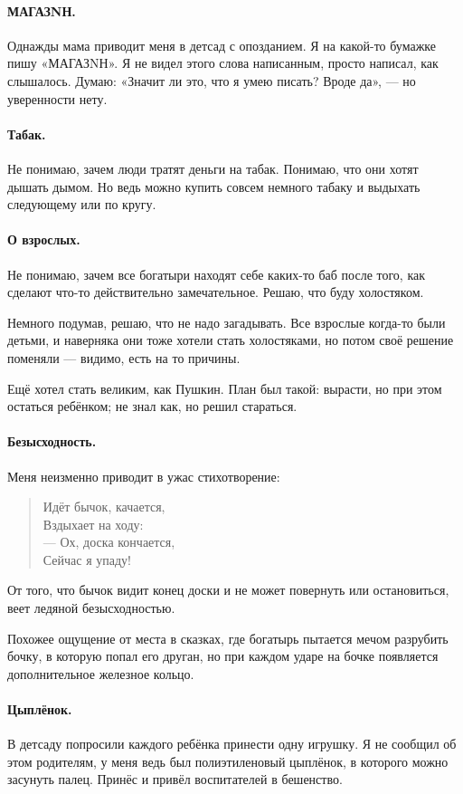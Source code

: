 \documentclass{book}
\begin{document}
\paragraph{МАГАЗNН.}
Однажды мама приводит меня в детсад с опозданием.
Я на какой-то бумажке пишу «МАГАЗNН».
Я не видел этого слова написанным, просто написал, как слышалось.
Думаю: «Значит ли это, что я умею писать?
Вроде да», --- но уверенности нету.

\paragraph{Табак.}
Не понимаю, зачем люди тратят деньги на табак.
Понимаю, что они хотят дышать дымом.
Но ведь можно купить совсем немного табаку и выдыхать следующему или по кругу.

\paragraph{О взрослых.}
Не понимаю, зачем все богатыри находят себе каких-то баб после того, как сделают что-то действительно замечательное.
Решаю, что буду холостяком.

Немного подумав, решаю, что не надо загадывать.
Все взрослые когда-то были детьми, и наверняка они тоже хотели стать холостяками,
но потом своё решение поменяли --- видимо, есть на то причины.

Ещё хотел стать великим, как Пушкин.
План был такой: вырасти, но при этом остаться ребёнком; не знал как, но решил стараться.

\paragraph{Безысходность.} Меня неизменно приводит в ужас стихотворение:
\begin{verse}
Идёт бычок, качается,\\
Вздыхает на ходу:\\
--- Ох, доска кончается,\\
Сейчас я упаду!
\end{verse}
От того, что бычок видит конец доски и не может повернуть или остановиться, веет ледяной безысходностью.

Похожее ощущение от места в сказках, где богатырь пытается мечом разрубить бочку, в которую попал его друган, но при каждом ударе на бочке появляется дополнительное железное кольцо.

\paragraph{Цыплёнок.}
В детсаду попросили каждого ребёнка принести одну игрушку.
Я не сообщил об этом родителям, у меня ведь был полиэтиленовый цыплёнок, в которого можно засунуть палец.
Принёс и привёл воспитателей в бешенство.
\end{document}
